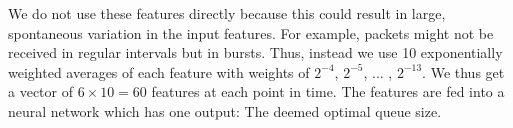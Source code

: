 \documentclass[conference]{IEEEtran}
\begin{document}
We do not use these features directly because this could result in large, spontaneous variation in the input features. For example, packets might not be received in regular intervals but in bursts. 
Thus, instead we use 10 exponentially weighted averages of each feature with weights of $2^{-4}$, $2^{-5}$, ... , $2^{-13}$.
We thus get a vector of $6\times 10 = 60$ features at each point in time. The features are fed into a neural network which has one output: The deemed optimal queue size.  

%
\end{document}
